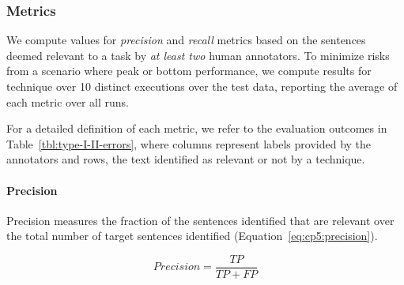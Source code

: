

\subsubsection{Metrics}



We compute values for \textit{precision} and \textit{recall} metrics based on the sentences 
deemed relevant to a task by \textit{at least two} human annotators.
To minimize risks from a scenario where    peak or bottom performance, 
we compute results for  technique over 10 distinct executions over the test data, 
reporting the average of each metric over all runs. 





For a detailed definition of each metric, we refer to the evaluation outcomes in Table~\ref{tbl:type-I-II-errors}, where  columns represent  labels provided by the annotators and rows,
the text identified as relevant or not by a technique.

% 

\medskip




\paragraph{\textbf{Precision}}

Precision measures the fraction of the sentences identified that are relevant over the total number of target sentences identified (Equation~\ref{eq:cp5:precision}).



\begin{equation}
\label{eq:cp5:precision}    
    Precision = \frac{TP}{TP + FP}
\end{equation}



